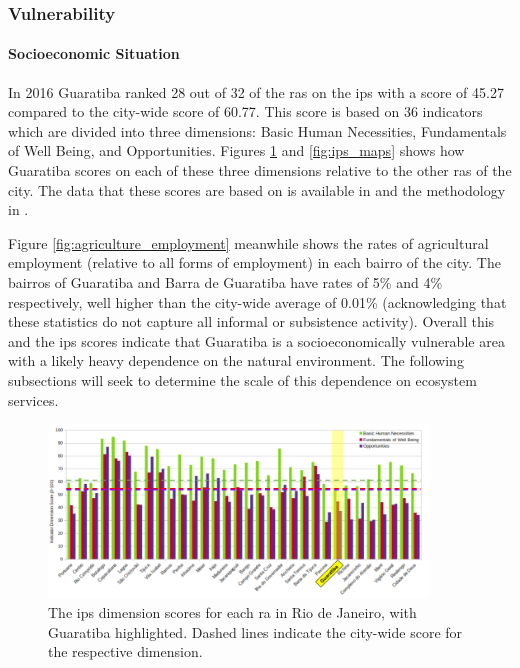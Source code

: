 \subsubsection{Vulnerability}

\paragraph{Socioeconomic Situation} \leavevmode\newline

In 2016 Guaratiba ranked 28 out of 32 of the \acp{ra} on the \ac{ips} with a score of 45.27 compared to the city-wide score of 60.77. This score is based on 36 indicators which are divided into three dimensions: Basic Human Necessities, Fundamentals of Well Being, and Opportunities. Figures \ref{fig:social_progress_indicator} and \ref{fig:ips_maps} shows how Guaratiba scores on each of these three dimensions relative to the other \acp{ra} of the city. The data that these scores are based on is available in \cite{institutopereirapassosBaseDadosIndice2022} and the methodology in \cite{puliciRelatorioMetodologicoIndice2016}.

Figure \ref{fig:agriculture_employment} meanwhile shows the rates of agricultural employment (relative to all forms of employment) in each bairro of the city. The bairros of Guaratiba and Barra de Guaratiba have rates of 5\% and 4\% respectively, well higher than the city-wide average of 0.01\% (acknowledging that these statistics do not capture all informal or subsistence activity). Overall this and the \ac{ips} scores indicate that Guaratiba is a socioeconomically vulnerable area with a likely heavy dependence on the natural environment. The following subsections will seek to determine the scale of this dependence on ecosystem services.

\begin{figure}[H] 
\centering
\includegraphics[width=0.90\textwidth]{Figures/chap4/social_progress_indicator.png}
\caption[Graph of Social Progress Indicator for Rio de Janeiro]{The \acf{ips} dimension scores for each \ac{ra} in Rio de Janeiro, with Guaratiba highlighted. Dashed lines indicate the city-wide score for the respective dimension.}
\label{fig:social_progress_indicator}
\end{figure}

